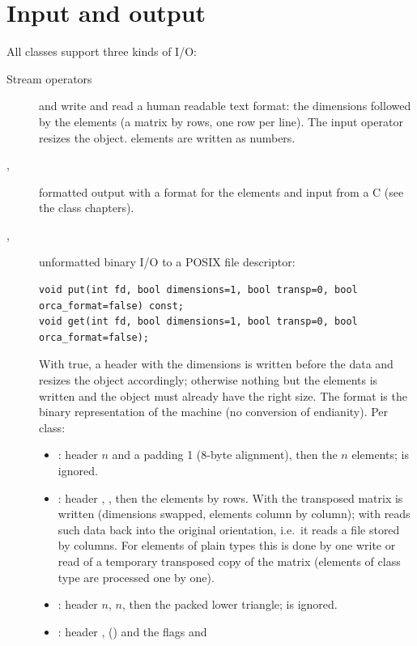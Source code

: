 \section{Input and output}\label{sec:concepts:io}

All classes support three kinds of I/O:
\begin{description}
\item[Stream operators]  and  write and read a human readable text format:
	the dimensions followed by the elements (a matrix by rows, one row per line). The input operator resizes the
	object.  elements are written as numbers.
\item[, ] formatted output with a  format for the elements and input
	from a C  (see the class chapters).
\item[, ] unformatted binary I/O to a POSIX file descriptor:
\begin{lstlisting}
void put(int fd, bool dimensions=1, bool transp=0, bool orca_format=false) const;
void get(int fd, bool dimensions=1, bool transp=0, bool orca_format=false);
\end{lstlisting}
	With  true, a header with the dimensions is written before the data and  resizes the
	object accordingly; otherwise nothing but the elements is written and the object must already have the right size.
	The format is the binary representation of the machine (no conversion of endianity). Per class:
	\begin{itemize}
	\item {}: header $n$ and a padding  1 (8-byte alignment), then the $n$ elements;  is ignored.
	\item {}: header , , then the elements by rows. With  the transposed matrix is
	written (dimensions swapped, elements column by column);  with  reads such data back into the
	original orientation, i.e.\ it reads a file stored by columns. For elements of plain types this is done by one
	write or read of a temporary transposed copy of the matrix (elements of class type are processed one by one).
	\item {}: header $n$, $n$, then the packed lower triangle;  is ignored.
	\item {}: header ,  () and the  flags  and

\end{itemize}
\end{description}
